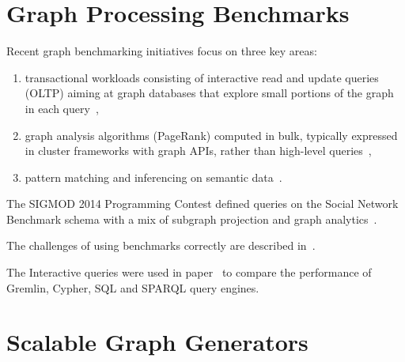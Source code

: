 
\section{Graph Processing Benchmarks}

Recent graph benchmarking initiatives focus on three key areas:

\begin{enumerate}
\item transactional workloads consisting of interactive read and update queries (OLTP) aiming at graph databases that explore small portions of the graph in each query~\cite{DBLP:conf/cidr/BarahmandG13,DBLP:conf/sigmod/ArmstrongPBC13,DBLP:journals/ase/DayarathnaS14,DBLP:conf/sigmod/ErlingALCGPPB15,DBLP:journals/pvldb/LissandriniBV18},
\item graph analysis algorithms (\eg PageRank) computed in bulk, typically expressed in cluster frameworks with graph APIs, rather than high-level queries~\cite{DBLP:conf/hipc/BaderM05,DBLP:conf/bigdataconf/ElserM13,DBLP:conf/sc/NaiXTKL15,DBLP:journals/pvldb/IosupHNHPMCCSAT16},
\item pattern matching and inferencing on semantic data~\cite{DBLP:journals/ws/GuoPH05,DBLP:books/sp/virgilio09/SchmidtHMPL09,DBLP:conf/semweb/MorseyLAN11,DBLP:conf/semweb/AlucHOD14,DBLP:journals/sosym/SzarnyasIRV18}.
\end{enumerate}

The SIGMOD 2014 Programming Contest defined queries on the Social Network Benchmark schema with a mix of subgraph projection and graph analytics~\cite{DBLP:journals/corr/abs-2010-12243}.

The challenges of using benchmarks correctly are described in~\cite{DBLP:conf/sigmod/RaasveldtHGM18}.

The Interactive queries were used in paper~\cite{DBLP:conf/grades/PacaciZLO17} to compare the performance of Gremlin, Cypher, SQL and SPARQL query engines.


\section{Scalable Graph Generators}

